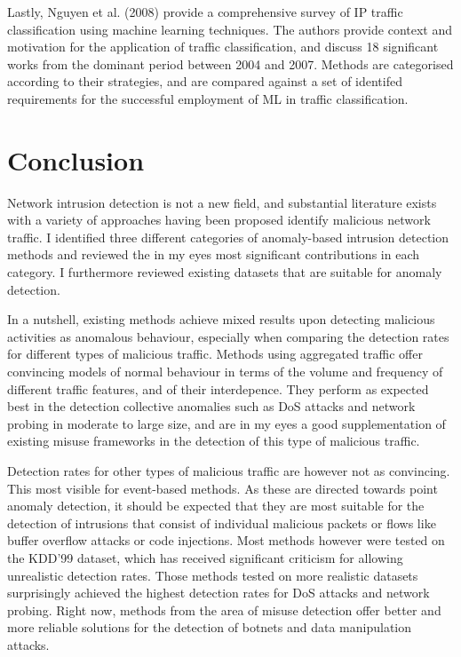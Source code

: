\documentclass[a4paper,12pt,twoside]{report}
\begin{document}
Lastly, Nguyen et al. \cite{nguyen_survey_2008} (2008) provide a comprehensive survey of IP traffic classification using machine learning techniques. The authors provide  context  and motivation  for the  application of  traffic  classification, and discuss 18 significant works from the dominant period between 2004 and 2007. Methods are categorised according to their strategies, and are compared against a set of identifed requirements for the successful employment of ML in traffic classification. 




\section{Conclusion}

Network intrusion detection is not a new field, and substantial literature exists with a variety of approaches having been proposed identify malicious network traffic. I identified three different categories of anomaly-based intrusion detection methods and reviewed the in my eyes most significant contributions in each category. I furthermore reviewed existing datasets that are suitable for anomaly detection. 

In a nutshell, existing methods achieve mixed results upon detecting malicious activities as anomalous behaviour, especially when comparing the detection rates for different types of malicious traffic. Methods using aggregated traffic offer convincing models of normal behaviour in terms of the volume and frequency of different traffic features, and of their interdepence. They perform as expected best in the detection collective anomalies such as DoS attacks and network probing in moderate to large size, and are in my eyes a good supplementation of existing misuse frameworks in the detection of this type of malicious traffic.  

Detection rates for other types of malicious traffic are however not as convincing. This most visible for event-based methods. As these are directed towards point anomaly detection, it should be expected that they are most suitable for the detection of intrusions that consist of individual malicious packets or flows like buffer overflow attacks or code injections. Most methods however were tested on the KDD'99 dataset, which has received significant criticism for allowing unrealistic detection rates. Those methods tested on more realistic datasets surprisingly achieved the highest detection rates for DoS attacks and network probing.  Right now, methods from the area of misuse detection offer better and more reliable solutions for the detection of botnets and data manipulation attacks.
\end{document}
